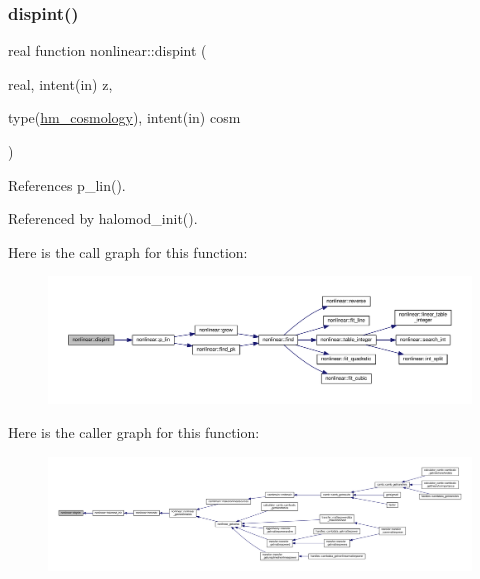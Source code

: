 \subsubsection{\texorpdfstring{dispint()}{dispint()}}
{\footnotesize\ttfamily real function nonlinear\+::dispint (\begin{DoxyParamCaption}\item[{real, intent(in)}]{z,  }\item[{type(\mbox{\hyperlink{structnonlinear_1_1hm__cosmology}{hm\+\_\+cosmology}}), intent(in)}]{cosm }\end{DoxyParamCaption})\hspace{0.3cm}{\ttfamily [private]}}



References p\+\_\+lin().



Referenced by halomod\+\_\+init().

Here is the call graph for this function\+:
\nopagebreak
\begin{figure}[H]
\begin{center}
\leavevmode
\includegraphics[width=350pt]{namespacenonlinear_ae44a5c4f7412d42923e10f9a241d2e74_cgraph}
\end{center}
\end{figure}
Here is the caller graph for this function\+:
\nopagebreak
\begin{figure}[H]
\begin{center}
\leavevmode
\includegraphics[width=350pt]{namespacenonlinear_ae44a5c4f7412d42923e10f9a241d2e74_icgraph}
\end{center}
\end{figure}
\mbox{\label{namespacenonlinear_a96b424e6fa8e55242e57bbd2e607a70d}} 
